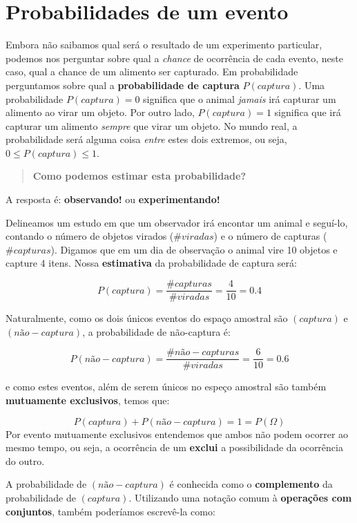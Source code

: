 \documentclass[
]{book}
\begin{document}
\hypertarget{probabilidades-de-um-evento}{%
\section{Probabilidades de um evento}\label{probabilidades-de-um-evento}}

Embora não saibamos qual será o resultado de um experimento particular, podemos nos perguntar sobre qual a \emph{chance} de ocorrência de cada evento, neste caso, qual a chance de um alimento ser capturado. Em probabilidade perguntamos sobre qual a \textbf{probabilidade de captura} \(P(captura)\). Uma probabilidade \(P(captura) = 0\) significa que o animal \emph{jamais} irá capturar um alimento ao virar um objeto. Por outro lado, \(P(captura) = 1\) significa que irá capturar um alimento \emph{sempre} que virar um objeto. No mundo real, a probabilidade será alguma coisa \emph{entre} estes dois extremos, ou seja, \(0 \le P(captura) \le 1\).

\begin{quote}
\textbf{Como podemos estimar esta probabilidade?}
\end{quote}

A resposta é: \textbf{observando!} ou \textbf{experimentando!}

Delineamos um estudo em que um observador irá encontar um animal e seguí-lo, contando o número de objetos virados (\(\#viradas\)) e o número de capturas (\(\#capturas\)). Digamos que em um dia de observação o animal vire 10 objetos e capture 4 itens. Nossa \textbf{estimativa} da probabilidade de captura será:

\[P(captura) = \frac{\#capturas}{\#viradas} = \frac{4}{10} = 0.4\]

Naturalmente, como os dois únicos eventos do espaço amostral são \((captura)\) e \((não-captura)\), a probabilidade de não-captura é:

\[P(não-captura) = \frac{\#não-capturas}{\#viradas} = \frac{6}{10} = 0.6\]

e como estes eventos, além de serem únicos no espeço amostral são também \textbf{mutuamente exclusivos}, temos que:

\[P(captura) + P(não-captura) = 1 = P(\Omega)\]
Por evento mutuamente exclusivos entendemos que ambos não podem ocorrer ao mesmo tempo, ou seja, a ocorrência de um \textbf{exclui} a possibilidade da ocorrência do outro.

A probabilidade de \((não-captura)\) é conhecida como o \textbf{complemento} da probabilidade de \((captura)\). Utilizando uma notação comum à \textbf{operações com conjuntos}, também poderíamos escrevê-la como:
\end{document}
